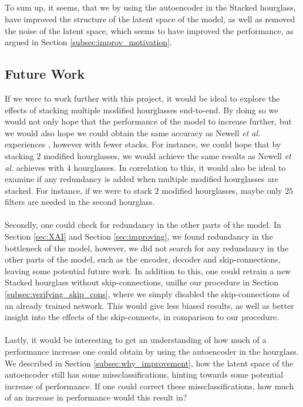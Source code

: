 \documentclass[./main.tex]{subfiles}
\begin{document}
\\
\\
\\
\\
To sum up, it seems, that we by using the autoencoder in the Stacked hourglass, have improved the structure of the latent space of the model, as well as removed the noise of the latent space, which seems to have improved the performance, as argued in Section \ref{subsec:improv_motivation}.

\subsection{Future Work}\label{subsec:Future_work}
If we were to work further with this project, it would be ideal to explore the effects of stacking multiple modified hourglasses end-to-end. By doing so we would not only hope that the performance of the model to increase further, but we would also hope we could obtain the same accuracy as Newell \textit{et al.} experiences \cite{Newell}, however with fewer stacks. For instance, we could hope that by stacking $2$ modified hourglasses, we would achieve the same results as Newell \textit{et al.}  \cite{Newell} achieves with $4$ hourglasses. In correlation to this, it would also be ideal to examine if any redundancy is added when multiple modified hourglasses are stacked. For instance, if we were to stack $2$ modified hourglasses, maybe only $25$ filters are needed in the second hourglass.
\\
\\
Secondly, one could check for redundancy in the other parts of the model. In Section \ref{sec:XAI} and Section \ref{sec:improving}, we found redundancy in the bottleneck of the model, however, we did not search for any redundancy in the other parts of the model, such as the encoder, decoder and skip-connections, leaving some potential future work. In addition to this, one could retrain a new Stacked hourglass without skip-connections, unilke our procedure in Section \ref{subsec:verifying_skip_cons}, where we simply disabled the skip-connections of an already trained network. This would give less biased results, as well as better insight into the effects of the skip-connects, in comparison to our procedure.
\\
\\
Lastly, it would be interesting to get an understanding of how much of a performance increase one could obtain by using the autoencoder in the hourglass. We described in Section \ref{subsec:why_improvement}, how the latent space of the autoencoder still has some missclassifications, hinting towards some potential increase of performance. If one could correct these missclassifications, how much of an increase in performance would this result in?
\end{document}
